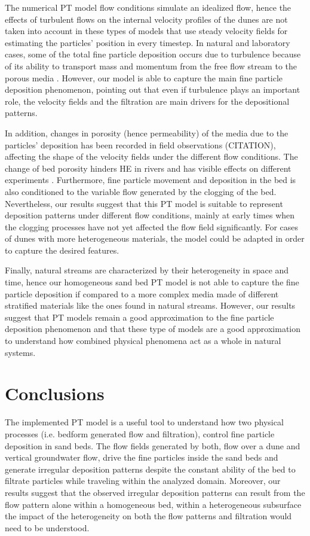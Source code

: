 \documentclass[draft,linenumbers]{agujournal2018}
\begin{document}
The numerical PT model flow conditions simulate an idealized flow, hence the effects of turbulent flows on the internal velocity profiles of the dunes are not taken into account in these types of models that use steady velocity fields for estimating the particles' position in every timestep. In natural and laboratory cases, some of the total fine particle deposition occurs due to turbulence because of its ability to transport mass and momentum from the free flow stream to the porous media \citep{Roche2018}. However, our model is able to capture the main fine particle deposition phenomenon, pointing out that even if turbulence plays an important role, the velocity fields and the filtration are main drivers for the depositional patterns.

In addition, changes in porosity (hence permeability) of the media due to the particles' deposition has been recorded in field observations (CITATION), affecting the shape of the velocity fields under the different flow conditions. The change of bed porosity hinders HE in rivers and has visible effects on different experiments \citep{Fox2018}. Furthermore, fine particle movement and deposition in the bed is also conditioned to the variable flow generated by the clogging of the bed. Nevertheless, our results suggest that this PT model is suitable to represent deposition patterns under different flow conditions, mainly at early times when the clogging processes have not yet affected the flow field significantly. For cases of dunes with more heterogeneous materials, the model could be adapted in order to capture the desired features. 

Finally, natural streams are characterized by their heterogeneity in space and time, hence our homogeneous sand bed PT model is not able to capture the fine particle deposition if compared to a more complex media made of different stratified materials like the ones found in natural streams. However, our results suggest that PT models remain a good approximation to the fine particle deposition phenomenon and that these type of models are a good approximation to understand how combined physical phenomena act as a whole in natural systems. 

\section{Conclusions} \label{Conclusions}

The implemented PT model is a useful tool to understand how two physical processes (i.e. bedform generated flow and filtration), control fine particle deposition in sand beds. The flow fields generated by both, flow over a dune and vertical groundwater flow, drive the fine particles inside the sand beds and generate irregular deposition patterns despite the constant ability of the bed to filtrate particles while traveling within the analyzed domain. Moreover, our results suggest that the observed irregular deposition patterns can result from the flow pattern alone within a homogeneous bed, within a heterogeneous subsurface the impact of the heterogeneity on both the flow patterns and filtration would need to be understood. 
\end{document}
